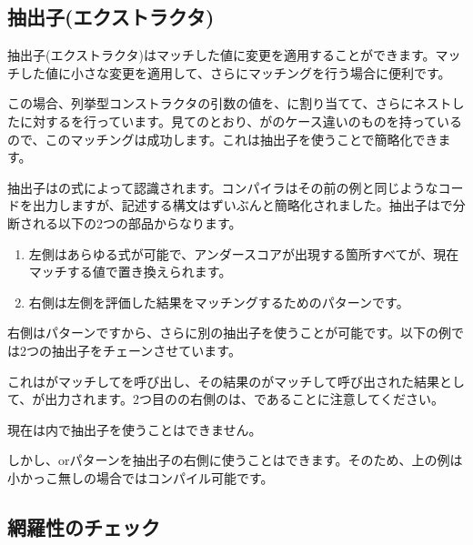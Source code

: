 \subsection{抽出子(エクストラクタ)}
\label{lf-pattern-matching-extractors}

抽出子(エクストラクタ)はマッチした値に変更を適用することができます。マッチした値に小さな変更を適用して、さらにマッチングを行う場合に便利です。


この場合、列挙型コンストラクタの引数の値を、に割り当てて、さらにネストしたに対するを行っています。見てのとおり、がのケース違いのものを持っているので、このマッチングは成功します。これは抽出子を使うことで簡略化できます。


抽出子はの式によって認識されます。コンパイラはその前の例と同じようなコードを出力しますが、記述する構文はずいぶんと簡略化されました。抽出子は\expr{=>}で分断される以下の2つの部品からなります。

\begin{enumerate}
\item 左側はあらゆる式が可能で、アンダースコア\expr{_}が出現する箇所すべてが、現在マッチする値で置き換えられます。
\item 右側は左側を評価した結果をマッチングするためのパターンです。
\end{enumerate}

右側はパターンですから、さらに別の抽出子を使うことが可能です。以下の例では2つの抽出子をチェーンさせています。


これはがマッチしてを呼び出し、その結果のがマッチして呼び出された結果として、が出力されます。2つ目の\expr{=>}の右側のは、であることに注意してください。

現在は内で抽出子を使うことはできません。


しかし、orパターンを抽出子の右側に使うことはできます。そのため、上の例は小かっこ無しの場合ではコンパイル可能です。

\subsection{網羅性のチェック}
\label{lf-pattern-matching-exhaustiveness}

